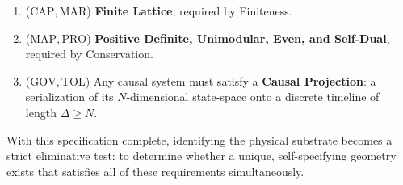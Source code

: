 \begin{enumerate}
    \item ($\mathrm{CAP}, \mathrm{MAR}$) \textbf{Finite Lattice}, required by Finiteness.
    \item ($\mathrm{MAP}, \mathrm{PRO}$) \textbf{Positive Definite, Unimodular, Even, and Self-Dual}, required by Conservation. 
    \item ($\mathrm{GOV}, \mathrm{TOL}$) Any causal system must satisfy a \textbf{Causal Projection}: a serialization of its $N$-dimensional state-space onto a discrete timeline of length $\Delta \ge N$.
\end{enumerate}

With this specification complete, identifying the physical substrate becomes a strict eliminative test: to determine whether a unique, self-specifying geometry exists that satisfies all of these requirements simultaneously.